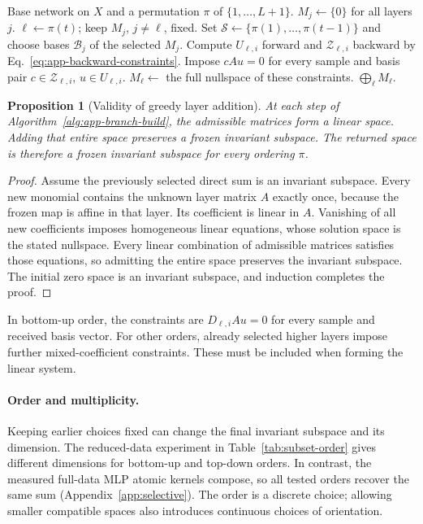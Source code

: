 \documentclass[twoside]{article}
\newtheorem{proposition}[theorem]{Proposition}
\theoremstyle{remark}
\theoremstyle{highlightdefinition}
\theoremstyle{remark}
\begin{document}
\begin{algorithm}[H]
\caption{Greedy construction in any layer order}\label{alg:app-branch-build}
\small
\begin{algorithmic}[1]
\Require Base network on $X$ and a permutation $\pi$ of $\{1,\ldots,L+1\}$.
\State $M_j\gets\{0\}$ for all layers $j$.
 \State $\ell\gets\pi(t)$; keep $M_j$, $j\ne\ell$, fixed.
 \State Set $\mathcal S\gets\{\pi(1),\ldots,\pi(t-1)\}$ and choose bases $\mathcal B_j$ of the selected $M_j$.
 \State Compute $U_{\ell,i}$ forward and $\mathcal Z_{\ell,i}$ backward by Eq.~\eqref{eq:app-backward-constraints}.
 \State Impose $cAu=0$ for every sample and basis pair $c\in\mathcal Z_{\ell,i}$, $u\in U_{\ell,i}$.
 \State $M_\ell\gets$ the full nullspace of these constraints.
\EndFor
\State \Return $\bigoplus_\ell M_\ell$.
\end{algorithmic}
\end{algorithm}

\begin{proposition}[Validity of greedy layer addition]
At each step of Algorithm~\ref{alg:app-branch-build}, the admissible matrices form a linear space. Adding that entire space preserves a frozen invariant subspace. The returned space is therefore a frozen invariant subspace for every ordering $\pi$.
\end{proposition}
\begin{proof}
Assume the previously selected direct sum is an invariant subspace. Every new monomial contains the unknown layer matrix $A$ exactly once, because the frozen map is affine in that layer. Its coefficient is linear in $A$. Vanishing of all new coefficients imposes homogeneous linear equations, whose solution space is the stated nullspace. Every linear combination of admissible matrices satisfies those equations, so admitting the entire space preserves the invariant subspace. The initial zero space is an invariant subspace, and induction completes the proof.
\end{proof}
In bottom-up order, the constraints are $D_{\ell,i}Au=0$ for every sample and received basis vector. For other orders, already selected higher layers impose further mixed-coefficient constraints. These must be included when forming the linear system.

\paragraph{Order and multiplicity.}
Keeping earlier choices fixed can change the final invariant subspace and its dimension. The reduced-data experiment in Table~\ref{tab:subset-order} gives different dimensions for bottom-up and top-down orders. In contrast, the measured full-data MLP atomic kernels compose, so all tested orders recover the same sum (Appendix~\ref{app:selective}). The order is a discrete choice; allowing smaller compatible spaces also introduces continuous choices of orientation.
\end{document}
